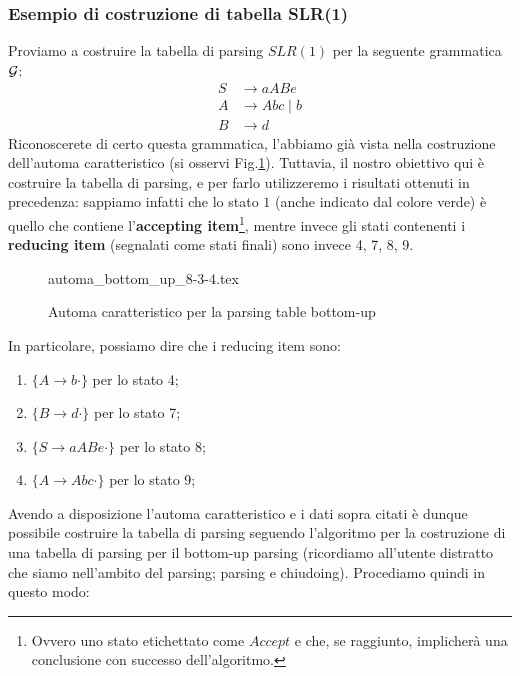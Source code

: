 \documentclass[class=book, crop=false, oneside, 12pt]{standalone}
\begin{document}
\subsubsection{Esempio di costruzione di tabella SLR(1)}
Proviamo a costruire la tabella di parsing \(SLR(1)\) per la seguente grammatica \(\mathcal{G}\):
\begin{align*}
    S &\rightarrow aABe \\
    A &\rightarrow Abc \mid b \\
    B &\rightarrow d
\end{align*}
Riconoscerete di certo questa grammatica, l'abbiamo già vista nella costruzione dell'automa caratteristico (si osservi Fig.\ref{fig:charateristic-automata-complete}). Tuttavia, il nostro obiettivo qui è costruire la tabella di parsing, e per farlo utilizzeremo i risultati ottenuti in precedenza: sappiamo infatti che lo stato \(1\) (anche indicato dal colore verde) è quello che contiene l'\textbf{accepting item}\footnote{Ovvero uno stato etichettato come \(Accept\) e che, se raggiunto, implicherà una conclusione con successo dell'algoritmo.}, mentre invece gli stati contenenti i \textbf{reducing item} (segnalati come stati finali) sono invece 4, 7, 8, 9. 
\begin{figure}[H]
    \centering
	{automa_bottom_up_8-3-4.tex}
    \caption{Automa caratteristico per la parsing table bottom-up}
    \label{fig:charateristic-automata-complete}    
\end{figure}
In particolare, possiamo dire che i reducing item sono:
\begin{enumerate}
    \item \(\{A \rightarrow b \cdot\}\) per lo stato 4;
    \item \(\{B \rightarrow d \cdot\}\) per lo stato 7;
    \item \(\{S \rightarrow aABe \cdot\}\) per lo stato 8;
    \item \(\{A \rightarrow Abc \cdot\}\) per lo stato 9;
\end{enumerate}
Avendo a disposizione l'automa caratteristico e i dati sopra citati è dunque possibile costruire la tabella di parsing seguendo l'algoritmo per la costruzione di una tabella di parsing per il bottom-up parsing (ricordiamo all'utente distratto che siamo nell'ambito del parsing; parsing e chiudoing). Procediamo quindi in questo modo:
\end{document}
